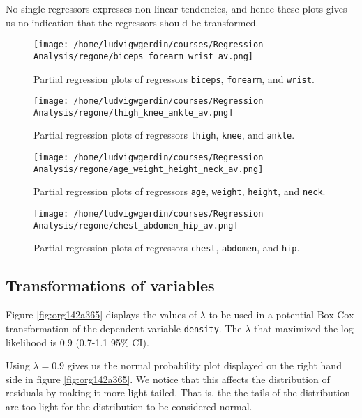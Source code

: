 \documentclass[11pt]{article}
\begin{document}
No single regressors expresses non-linear tendencies, and hence these plots gives us no indication 
that the regressors should be transformed.

\begin{figure}[htbp]
\centering
\texttt{[image: /home/ludvigwgerdin/courses/Regression Analysis/regone/biceps\_forearm\_wrist\_av.png]}
\caption{\label{fig:orged235d8}
Partial regression plots of regressors \texttt{biceps}, \texttt{forearm}, and \texttt{wrist}.}
\end{figure}   

\begin{figure}[htbp]
\centering
\texttt{[image: /home/ludvigwgerdin/courses/Regression Analysis/regone/thigh\_knee\_ankle\_av.png]}
\caption{\label{fig:orgaeee725}
Partial regression plots of regressors \texttt{thigh}, \texttt{knee}, and \texttt{ankle}.}
\end{figure}

\begin{figure}[htbp]
\centering
\texttt{[image: /home/ludvigwgerdin/courses/Regression Analysis/regone/age\_weight\_height\_neck\_av.png]}
\caption{\label{fig:org2f2307f}
Partial regression plots of regressors \texttt{age}, \texttt{weight}, \texttt{height}, and \texttt{neck}.}
\end{figure}

\begin{figure}[htbp]
\centering
\texttt{[image: /home/ludvigwgerdin/courses/Regression Analysis/regone/chest\_abdomen\_hip\_av.png]}
\caption{\label{fig:org2fb573c}
Partial regression plots of regressors \texttt{chest}, \texttt{abdomen}, and \texttt{hip}.}
\end{figure}
\subsection{Transformations of variables}
\label{sec:orgc0591b5}

Figure \ref{fig:org142a365} displays the values of \(\lambda\) to be used in a potential Box-Cox transformation of 
the dependent variable \texttt{density}. The \(\lambda\) that maximized the log-likelihood is 0.9 (0.7-1.1 95\% CI). 

Using \(\lambda = 0.9\) gives us the normal probability plot displayed on the right hand side in figure \ref{fig:org142a365}.
We notice that this affects the distribution of residuals by making it more light-tailed. That is, the 
the tails of the distribution are too light for the distribution to be considered normal.
\end{document}
